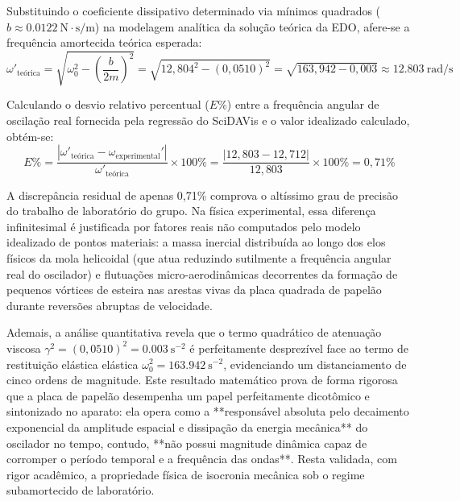 \documentclass[12pt, a4paper]{article}
\begin{document}
Substituindo o coeficiente dissipativo determinado via mínimos quadrados ($b \approx \SI{0,0122}{\newton\cdot\second/\meter}$) na modelagem analítica da solução teórica da EDO, afere-se a frequência amortecida teórica esperada:
\begin{equation}
    \omega'_{\text{teórica}} = \sqrt{\omega_0^2 - \left(\frac{b}{2m}\right)^2} = \sqrt{12,804^2 - (0,0510)^2} = \sqrt{163,942 - 0,003} \approx \SI{12,803}{\text{rad}/\second}
\end{equation}

Calculando o desvio relativo percentual ($E\%$) entre a frequência angular de oscilação real fornecida pela regressão do SciDAVis e o valor idealizado calculado, obtém-se:
\begin{equation}
    E\% = \frac{|\omega'_{\text{teórica}} - \omega_{\text{experimental}}'|}{\omega'_{\text{teórica}}} \times 100\% = \frac{|12,803 - 12,712|}{12,803} \times 100\% = 0,71\%
\end{equation}

A discrepância residual de apenas 0,71\% comprova o altíssimo grau de precisão do trabalho de laboratório do grupo. Na física experimental, essa diferença infinitesimal é justificada por fatores reais não computados pelo modelo idealizado de pontos materiais: a massa inercial distribuída ao longo dos elos físicos da mola helicoidal (que atua reduzindo sutilmente a frequência angular real do oscilador) e flutuações micro-aerodinâmicas decorrentes da formação de pequenos vórtices de esteira nas arestas vivas da placa quadrada de papelão durante reversões abruptas de velocidade.

Ademais, a análise quantitativa revela que o termo quadrático de atenuação viscosa $\gamma^2 = (0,0510)^2 = \SI{0,003}{\second^{-2}}$ é perfeitamente desprezível face ao termo de restituição elástica elástica $\omega_0^2 = \SI{163,942}{\second^{-2}}$, evidenciando um distanciamento de cinco ordens de magnitude. Este resultado matemático prova de forma rigorosa que a placa de papelão desempenha um papel perfeitamente dicotômico e sintonizado no aparato: ela opera como a **responsável absoluta pelo decaimento exponencial da amplitude espacial e dissipação da energia mecânica** do oscilador no tempo, contudo, **não possui magnitude dinâmica capaz de corromper o período temporal e a frequência das ondas**. Resta validada, com rigor acadêmico, a propriedade física de isocronia mecânica sob o regime subamortecido de laboratório.

\end{document}
